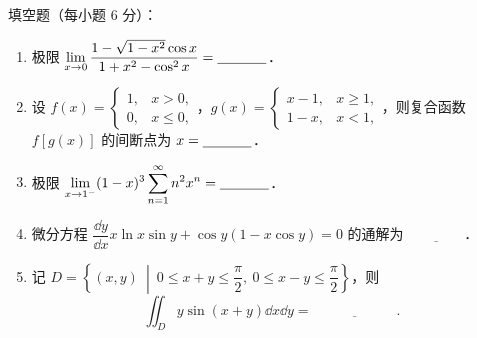 
填空题（每小题 6 分）：
\begin{enumerate}[label=(\arabic*)]
  \item 极限 $\displaystyle \lim_{x\to0}\frac{1-\sqrt{1-x^2}\cos x}{1+x^2-\cos^2x}=\underline{\hspace{3.5em}}$．
  \item 设 $f(x)=\begin{cases}1,&x>0,\\0,&x\le0,\end{cases}$，$g(x)=\begin{cases}x-1,&x\ge1,\\1-x,&x<1,\end{cases}$，则复合函数 $f[g(x)]$ 的间断点为 $x=\underline{\hspace{3.5em}}$．
  \item 极限 $\displaystyle \lim_{x\to1^-}(1-x)^3\sum_{n=1}^{\infty}n^2x^n=\underline{\hspace{3.5em}}$．
  \item 微分方程 $\dfrac{\dd y}{\dd x}x\ln x\sin y+\cos y(1-x\cos y)=0$ 的通解为 $\underline{\hspace{4em}}$．
  \item 记 $D=\left\{(x,y)\ \middle|\ 0\le x+y\le\dfrac{\pi}{2},\ 0\le x-y\le\dfrac{\pi}{2}\right\}$，则
  \[
    \iint_D y\sin(x+y)\dd x\dd y=\underline{\hspace{6em}}.
  \]
\end{enumerate}
